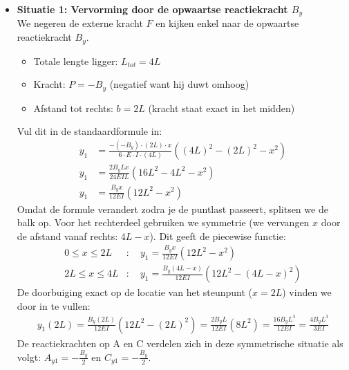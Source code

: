 \documentclass[a4paper,11pt,twoside]{report}
\begin{document}
\begin{itemize}
    \item \textbf{Situatie 1: Vervorming door de opwaartse reactiekracht $B_y$} \\
          We negeren de externe kracht $F$ en kijken enkel naar de opwaartse reactiekracht $B_y$.
          \begin{itemize}
              \item Totale lengte ligger: $L_{tot} = 4L$
              \item Kracht: $P = -B_y$ (negatief want hij duwt omhoog)
              \item Afstand tot rechts: $b = 2L$ (kracht staat exact in het midden)
          \end{itemize}
          Vul dit in de standaardformule in:
          \begin{align*}
              y_1 & = \frac{-(-B_y) \cdot (2L) \cdot x}{6 \cdot E \cdot I \cdot (4L)} \left((4L)^2 - (2L)^2 - x^2\right) \\
              y_1 & = \frac{2 B_y L x}{24 E I L} \left(16L^2 - 4L^2 - x^2\right)                                         \\
              y_1 & = \frac{B_y x}{12EI} \left(12L^2 - x^2\right)
          \end{align*}
          Omdat de formule verandert zodra je de puntlast passeert, splitsen we de balk op. Voor het
          rechterdeel gebruiken we symmetrie (we vervangen $x$ door de afstand vanaf rechts: $4L - x$).
          Dit geeft de piecewise functie:
          \begin{align*}
              0 \le x \le 2L  & : \quad y_1 = \frac{B_y x}{12EI}(12L^2 - x^2)               \\
              2L \le x \le 4L & : \quad y_1 = \frac{B_y (4L - x)}{12EI}(12L^2 - (4L - x)^2)
          \end{align*}
          De doorbuiging exact op de locatie van het steunpunt ($x = 2L$) vinden we door in te vullen:
          \begin{align*}
              y_1(2L) = \frac{B_y (2L)}{12EI}(12L^2 - (2L)^2) = \frac{2B_y L}{12EI}(8L^2) = \frac{16B_y L^3}{12EI} = \frac{4B_y L^3}{3EI}
          \end{align*}
          De reactiekrachten op A en C verdelen zich in deze symmetrische situatie als volgt:
          $A_{y1} = -\frac{B_y}{2}$ en $C_{y1} = -\frac{B_y}{2}$.


\end{itemize}
\end{document}
